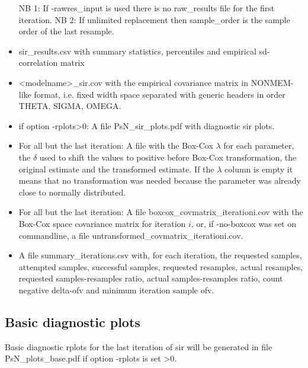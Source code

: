 \begin{itemize}
NB 1: If -rawres\_input is used there is no raw\_results file for the first iteration.
NB 2: If unlimited replacement then sample\_order is the sample order of the last resample.
\item sir\_results.csv with summary statistics, percentiles and empirical sd-correlation matrix
\item <modelname>\_sir.cov with the empirical covariance matrix in NONMEM-like format, i.e. 
      fixed width space separated with generic headers in order THETA, SIGMA, OMEGA.
\item if option -rplots>0: A file PsN\_sir\_plots.pdf with diagnostic sir plots.
\item For all but the last iteration: A file with the Box-Cox $\lambda$ for each parameter, the $\delta$ used to shift
the values to positive before Box-Cox transformation, the original estimate and the transformed estimate. 
If the $\lambda$ column is empty it means that no transformation was
needed because the parameter was already close to normally distributed.
\item For all but the last iteration: A file boxcox\_covmatrix\_iterationi.cov with 
the Box-Cox space covariance matrix for iteration $i$,
or, if -no-boxcox was set on commandline, a file untransformed\_covmatrix\_iterationi.cov.
\item A file summary\_iterations.csv with, for each iteration, 
the requested samples, attempted samples, successful samples, requested resamples,
actual resamples, requested samples-resamples ratio, actual samples-resamples ratio, count negative delta-ofv and minimum iteration sample ofv.
\end{itemize}

\subsection{Basic diagnostic plots}
Basic diagnostic rplots for the last iteration of sir will be generated 
in file  PsN\_plots\_base.pdf 
if option -rplots is set >0.

